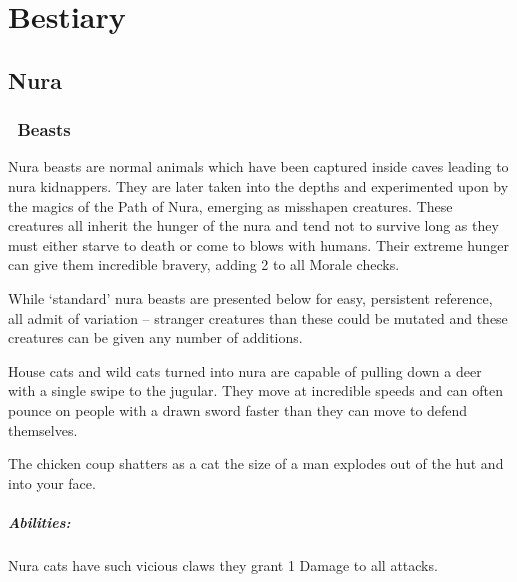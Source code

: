 \chapter{Bestiary}
\label{bestiary}


\section[Nura]{Nura \N}

\begin{multicols}{2}

\subsection[Beasts]{\A\N\ Beasts}

Nura beasts are normal animals which have been captured inside caves leading to nura kidnappers.
They are later taken into the depths and experimented upon by the magics of the Path of Nura, emerging as misshapen creatures.
These creatures all inherit the hunger of the nura and tend not to survive long as they must either starve to death or come to blows with humans.
Their extreme hunger can give them incredible bravery, adding 2 to all Morale checks.

While `standard' nura beasts are presented below for easy, persistent reference, all admit of variation -- stranger creatures than these could be mutated and these creatures can be given any number of additions.

\label{nura_cat}

House cats and wild cats turned into nura are capable of pulling down a deer with a single swipe to the jugular.
They move at incredible speeds and can often pounce on people with a drawn sword faster than they can move to defend themselves.

\begin{boxtext}

  The chicken coup shatters as a cat the size of a man explodes out of the hut and into your face.

\end{boxtext}

\paragraph{Abilities:}Nura cats have such vicious claws they grant 1 Damage to all attacks.


\end{multicols}
